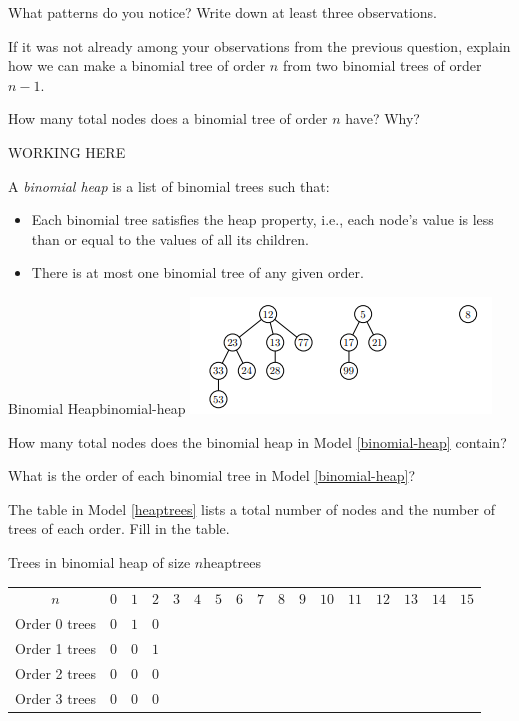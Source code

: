 \documentclass{tufte-handout}
\begin{document}
\begin{questions}
\item What patterns do you notice?  Write down at least three
  observations.

\item If it was not already among your observations from the previous
  question, explain how we can make a binomial tree of order $n$ from
  two binomial trees of order $n - 1$. \label{binomial-merge}

\item How many total nodes does a binomial tree of order $n$ have?
  Why?

WORKING HERE

\item A \emph{binomial heap} is a list of binomial trees such that:
\begin{itemize}
    \item Each binomial tree satisfies the heap property, i.e., each node's value is less than or equal to the values of all its children.
    \item There is at most one binomial tree of any given order.
\end{itemize}

\begin{model*}{Binomial Heap}{binomial-heap}
  \includegraphics[]{binomial_heap.PNG}
  \label{binomial-heap}
\end{model*}

How many total nodes does the binomial heap in Model \ref{binomial-heap} contain?

\item What is the order of each binomial tree in Model \ref{binomial-heap}?

\item The table in Model \ref{heaptrees} lists a total number of nodes and the number of trees of each order. Fill in the table.

\begin{model*}{Trees in binomial heap of size $n$}{heaptrees}
  \centering
  \begin{tabular}{c|cccccccccccccccc}
    $n$ & $0$ & $1$ & $2$ & $3$ & $4$ & $5$ & $6$ & $7$ & $8$ & $9$ & $10$
    & $11$ & $12$ & $13$ & $14$ & $15$  \\[8pt]
    Order 0 trees & $0$ & $1$ & $0$ & & & & & & & & & & & & & \\[8pt]
    Order 1 trees & $0$ & $0$ & $1$ & & & & & & & & & & & & & \\[8pt]
    Order 2 trees & $0$ & $0$ & $0$ & & & & & & & & & & & & & \\[8pt]
    Order 3 trees & $0$ & $0$ & $0$ & & & & & & & & & & & & & \\[8pt]
  \end{tabular}
  \label{heaptrees}
\end{model*}


\end{questions}
\end{document}
